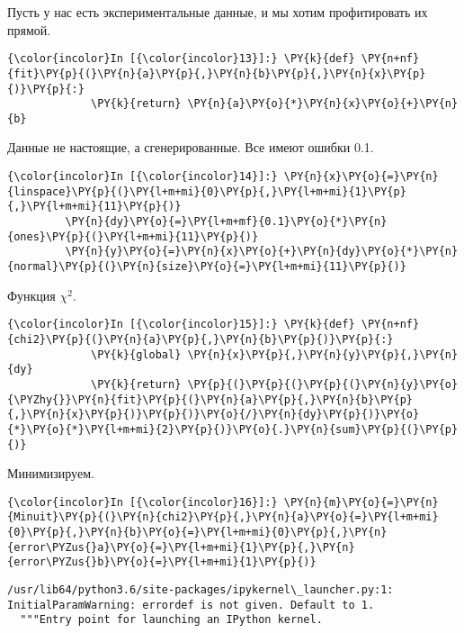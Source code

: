 Пусть у нас есть экспериментальные данные, и мы хотим профитировать их
прямой.

    \begin{Verbatim}[commandchars=\\\{\}]
{\color{incolor}In [{\color{incolor}13}]:} \PY{k}{def} \PY{n+nf}{fit}\PY{p}{(}\PY{n}{a}\PY{p}{,}\PY{n}{b}\PY{p}{,}\PY{n}{x}\PY{p}{)}\PY{p}{:}
             \PY{k}{return} \PY{n}{a}\PY{o}{*}\PY{n}{x}\PY{o}{+}\PY{n}{b}
\end{Verbatim}


    Данные не настоящие, а сгенерированные. Все имеют ошибки 0.1.

    \begin{Verbatim}[commandchars=\\\{\}]
{\color{incolor}In [{\color{incolor}14}]:} \PY{n}{x}\PY{o}{=}\PY{n}{linspace}\PY{p}{(}\PY{l+m+mi}{0}\PY{p}{,}\PY{l+m+mi}{1}\PY{p}{,}\PY{l+m+mi}{11}\PY{p}{)}
         \PY{n}{dy}\PY{o}{=}\PY{l+m+mf}{0.1}\PY{o}{*}\PY{n}{ones}\PY{p}{(}\PY{l+m+mi}{11}\PY{p}{)}
         \PY{n}{y}\PY{o}{=}\PY{n}{x}\PY{o}{+}\PY{n}{dy}\PY{o}{*}\PY{n}{normal}\PY{p}{(}\PY{n}{size}\PY{o}{=}\PY{l+m+mi}{11}\PY{p}{)}
\end{Verbatim}


    Функция \(\chi^2\).

    \begin{Verbatim}[commandchars=\\\{\}]
{\color{incolor}In [{\color{incolor}15}]:} \PY{k}{def} \PY{n+nf}{chi2}\PY{p}{(}\PY{n}{a}\PY{p}{,}\PY{n}{b}\PY{p}{)}\PY{p}{:}
             \PY{k}{global} \PY{n}{x}\PY{p}{,}\PY{n}{y}\PY{p}{,}\PY{n}{dy}
             \PY{k}{return} \PY{p}{(}\PY{p}{(}\PY{p}{(}\PY{n}{y}\PY{o}{\PYZhy{}}\PY{n}{fit}\PY{p}{(}\PY{n}{a}\PY{p}{,}\PY{n}{b}\PY{p}{,}\PY{n}{x}\PY{p}{)}\PY{p}{)}\PY{o}{/}\PY{n}{dy}\PY{p}{)}\PY{o}{*}\PY{o}{*}\PY{l+m+mi}{2}\PY{p}{)}\PY{o}{.}\PY{n}{sum}\PY{p}{(}\PY{p}{)}
\end{Verbatim}


    Минимизируем.

    \begin{Verbatim}[commandchars=\\\{\}]
{\color{incolor}In [{\color{incolor}16}]:} \PY{n}{m}\PY{o}{=}\PY{n}{Minuit}\PY{p}{(}\PY{n}{chi2}\PY{p}{,}\PY{n}{a}\PY{o}{=}\PY{l+m+mi}{0}\PY{p}{,}\PY{n}{b}\PY{o}{=}\PY{l+m+mi}{0}\PY{p}{,}\PY{n}{error\PYZus{}a}\PY{o}{=}\PY{l+m+mi}{1}\PY{p}{,}\PY{n}{error\PYZus{}b}\PY{o}{=}\PY{l+m+mi}{1}\PY{p}{)}
\end{Verbatim}


    \begin{Verbatim}[commandchars=\\\{\}]
/usr/lib64/python3.6/site-packages/ipykernel\_launcher.py:1: InitialParamWarning: errordef is not given. Default to 1.
  """Entry point for launching an IPython kernel.

    \end{Verbatim}


